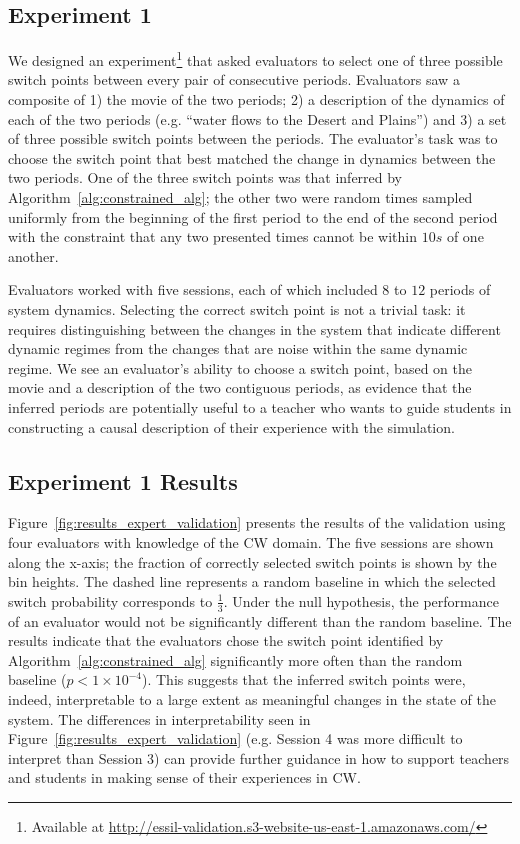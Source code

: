 \subsection{Experiment 1}\label{sec:experiment1-empirical-validation}

We designed an experiment\footnote{Available at \url{http://essil-validation.s3-website-us-east-1.amazonaws.com/}} that asked evaluators to select one of three possible switch points between every pair of consecutive periods. Evaluators saw a composite of 1) the movie of the two periods; 2) a description of the dynamics of each of the two periods (e.g. ``water flows to the Desert and Plains'') and 3) a set of three possible switch points between the periods. The evaluator's task was to choose the switch point that best matched the change in dynamics between the two periods. One of the three switch points was that inferred by Algorithm~\ref{alg:constrained_alg}; the other two were random times sampled uniformly from the beginning of the first period to the end of the second period with the constraint that any two presented times cannot be within $10s$ of one another.

Evaluators worked with five sessions, each of which included $8$ to $12$ periods of system dynamics. Selecting the correct switch point is not a trivial task: it requires distinguishing between the changes in the system that indicate different dynamic regimes from the changes that are noise within the same dynamic regime. We see an evaluator's ability to choose a switch point, based on the movie and a description of the two contiguous periods, as evidence that the inferred periods are potentially useful to a teacher who wants to guide students in constructing a causal description of their experience with the simulation.

\subsection{Experiment 1 Results}\label{sec:experiment1-empirical-validation-results}

Figure~\ref{fig:results_expert_validation} presents the results of the validation using four evaluators with knowledge of the CW domain. The five sessions are shown along the x-axis; the fraction of correctly selected switch points is shown by the bin heights. The dashed line represents a random baseline in which the selected switch probability corresponds to $\frac{1}{3}$. Under the null hypothesis, the performance of an evaluator would not be significantly different than the random baseline. The results indicate that the evaluators chose the switch point identified by Algorithm~\ref{alg:constrained_alg} significantly more often than the random baseline ($p < 1\times 10^{-4}$). This suggests that the inferred switch points were, indeed, interpretable to a large extent as meaningful changes in the state of the system. The differences in interpretability seen in Figure~\ref{fig:results_expert_validation} (e.g. Session 4 was more difficult to interpret than Session 3) can provide further guidance in how to support teachers and students in making sense of their experiences in CW.


